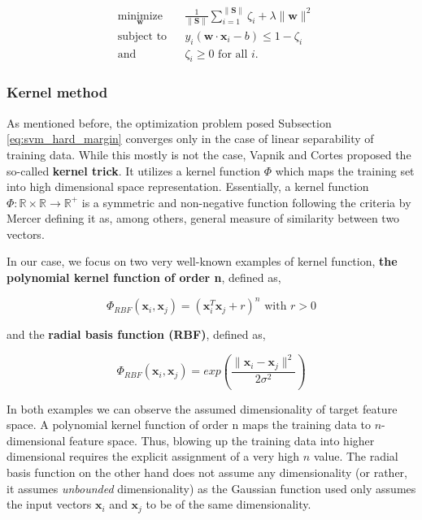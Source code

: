 \documentclass[pdftex,12pt,a4paper]{report}
\begin{document}
\begin{equation*}
\begin{aligned}
& \underset{\mathbf{
w}}{\text{minimize}}
& & \frac{1}{\| \mathbf{S} \|} \sum_{i=1}^{\| \mathbf{S} \|} \zeta_i + \lambda \| \mathbf{w} \|^2 \\
& \text{subject to}
& & y_i (\mathbf{w} \cdot \mathbf{x}_i - b) \leq 1 - \zeta_i \\
& \text{and} && \zeta_i \geq 0 \text{ for all } i.
\end{aligned}
\end{equation*}

\subsubsection*{Kernel method}

As mentioned before, the optimization problem posed Subsection \ref{eq:svm_hard_margin} converges only in the case of linear separability of training data. While this mostly is not the case, Vapnik and Cortes \cite{cortes1995support} proposed the so-called \textbf{kernel trick}. It utilizes a kernel function $\Phi$ which maps the training set into high dimensional space representation. Essentially, a kernel function $\Phi: \mathbb{R} \times \mathbb{R} \rightarrow \mathbb{R}^+$ is a symmetric and non-negative function following the criteria by Mercer \cite{mercer1909functions} defining it as, among others, general measure of similarity between two vectors.

In our case, we focus on two very well-known examples of kernel function, \textbf{the polynomial kernel function of order n}, defined as,

\begin{equation}
\Phi_{RBF}(\mathbf{x}_i, \mathbf{x}_j) = \left(\mathbf{x}_i^T \mathbf{x}_j + r \right)^n \text{ with } r > 0
\label{eq:svm_rbf}
\end{equation} 

and the \textbf{radial basis function (RBF)}, defined as,

\begin{equation}
\Phi_{RBF}(\mathbf{x}_i, \mathbf{x}_j) = exp\left(\frac{\| \mathbf{x}_i - \mathbf{x}_j \|^2}{2 \sigma^2}\right)
\label{eq:svm_rbf}
\end{equation}

In both examples we can observe the assumed dimensionality of target feature space. A polynomial kernel function of order n maps the training data to $n$-dimensional feature  space. Thus, blowing up the training data into higher dimensional requires the explicit assignment of a very high $n$ value. The  radial basis function on the other hand does not assume any dimensionality (or rather, it assumes \textit{unbounded} dimensionality) as the Gaussian function used only assumes the input vectors $\mathbf{x}_i$ and $\mathbf{x}_j$ to be of the same dimensionality. 
\end{document}
